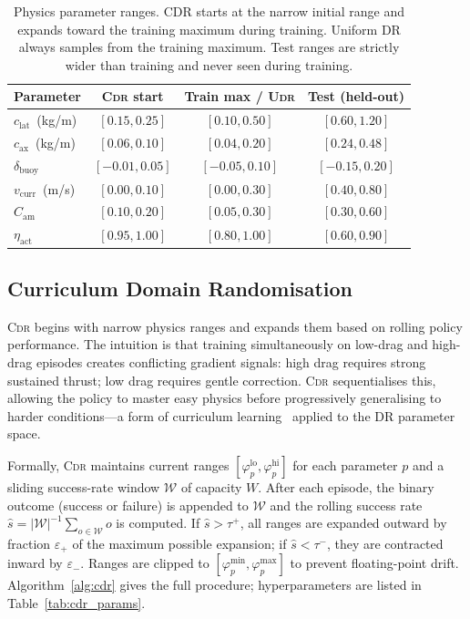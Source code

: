 \documentclass[letterpaper,10pt,journal]{IEEEtran}
\newcommand{\CDR}{\textsc{Cdr}\xspace}
\newcommand{\UDR}{\textsc{Udr}\xspace}
\begin{document}
\begin{table}[!t]
  \centering
  \caption{Physics parameter ranges. CDR starts at the narrow initial
           range and expands toward the training maximum during training.
           Uniform DR always samples from the training maximum.
           Test ranges are strictly wider than training and
           never seen during training.}
  \label{tab:dr_ranges}
  \renewcommand{\arraystretch}{1.2}
  \setlength{\tabcolsep}{4pt}
  \begin{tabular}{lccc}
    \toprule
    \textbf{Parameter}
      & \textbf{\CDR start}
      & \textbf{Train max / \UDR}
      & \textbf{Test (held-out)} \\
    \midrule
    $c_\mathrm{lat}$~(kg/m)
      & $[0.15, 0.25]$ & $[0.10, 0.50]$ & $[0.60, 1.20]$ \\
    $c_\mathrm{ax}$~(kg/m)
      & $[0.06, 0.10]$ & $[0.04, 0.20]$ & $[0.24, 0.48]$ \\
    $\delta_\mathrm{buoy}$
      & $[-0.01, 0.05]$ & $[-0.05, 0.10]$ & $[-0.15, 0.20]$ \\
    $v_\mathrm{curr}$~(m/s)
      & $[0.00, 0.10]$ & $[0.00, 0.30]$ & $[0.40, 0.80]$ \\
    $C_\mathrm{am}$
      & $[0.10, 0.20]$ & $[0.05, 0.30]$ & $[0.30, 0.60]$ \\
    $\eta_\mathrm{act}$
      & $[0.95, 1.00]$ & $[0.80, 1.00]$ & $[0.60, 0.90]$ \\
    \bottomrule
  \end{tabular}
\end{table}

\subsection{Curriculum Domain Randomisation}
\label{sec:cdr}

\CDR begins with narrow physics ranges and expands them based on rolling
policy performance.
The intuition is that training simultaneously on low-drag and high-drag
episodes creates conflicting gradient signals: high drag requires strong
sustained thrust; low drag requires gentle correction.
\CDR sequentialises this, allowing the policy to master easy physics
before progressively generalising to harder conditions---a form of
curriculum learning~\cite{bengio2009} applied to the DR parameter space.

Formally, \CDR maintains current ranges
$[\varphi_p^\mathrm{lo},\varphi_p^\mathrm{hi}]$ for each parameter
$p$ and a sliding success-rate window $\mathcal{W}$ of capacity $W$.
After each episode, the binary outcome (success or failure) is appended
to $\mathcal{W}$ and the rolling success rate
$\hat{s}=|\mathcal{W}|^{-1}\sum_{o\in\mathcal{W}}o$ is computed.
If $\hat{s}>\tau^+$, all ranges are expanded outward by fraction
$\varepsilon_+$ of the maximum possible expansion; if $\hat{s}<\tau^-$,
they are contracted inward by $\varepsilon_-$.
Ranges are clipped to $[\varphi_p^\mathrm{min},\varphi_p^\mathrm{max}]$
to prevent floating-point drift.
Algorithm~\ref{alg:cdr} gives the full procedure; hyperparameters
are listed in Table~\ref{tab:cdr_params}.
\end{document}
